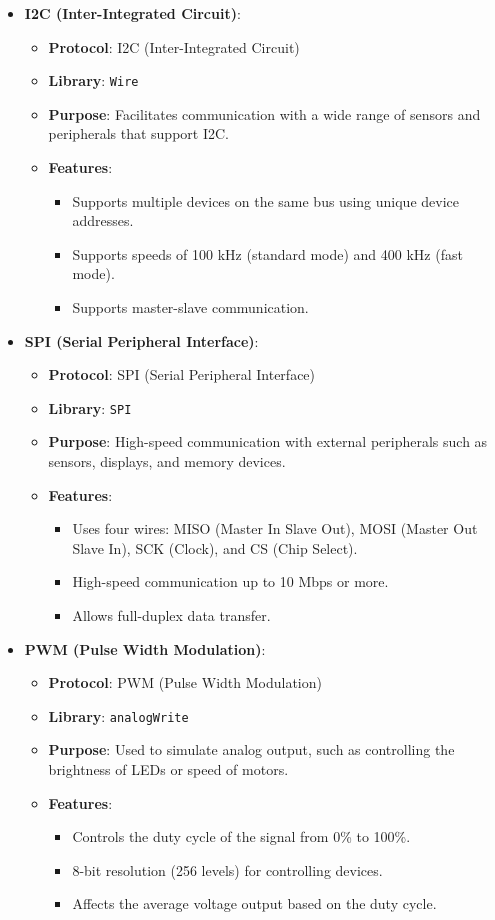 \begin{itemize}
		\item \textbf{I2C (Inter-Integrated Circuit)}:
		\begin{itemize}
			\item \textbf{Protocol}: I2C (Inter-Integrated Circuit)
			\item \textbf{Library}: \texttt{Wire}
			\item \textbf{Purpose}: Facilitates communication with a wide range of sensors and peripherals that support I2C.
			\item \textbf{Features}:
			\begin{itemize}
				\item Supports multiple devices on the same bus using unique device addresses.
				\item Supports speeds of 100 kHz (standard mode) and 400 kHz (fast mode).
				\item Supports master-slave communication.
			\end{itemize}
		\end{itemize}
		
		\item \textbf{SPI (Serial Peripheral Interface)}:
		\begin{itemize}
			\item \textbf{Protocol}: SPI (Serial Peripheral Interface)
			\item \textbf{Library}: \texttt{SPI}
			\item \textbf{Purpose}: High-speed communication with external peripherals such as sensors, displays, and memory devices.
			\item \textbf{Features}:
			\begin{itemize}
				\item Uses four wires: MISO (Master In Slave Out), MOSI (Master Out Slave In), SCK (Clock), and CS (Chip Select).
				\item High-speed communication up to 10 Mbps or more.
				\item Allows full-duplex data transfer.
			\end{itemize}
		\end{itemize}
		
		\item \textbf{PWM (Pulse Width Modulation)}:
		\begin{itemize}
			\item \textbf{Protocol}: PWM (Pulse Width Modulation)
			\item \textbf{Library}: \texttt{analogWrite}
			\item \textbf{Purpose}: Used to simulate analog output, such as controlling the brightness of LEDs or speed of motors.
			\item \textbf{Features}:
			\begin{itemize}
				\item Controls the duty cycle of the signal from 0\% to 100\%.
				\item 8-bit resolution (256 levels) for controlling devices.
				\item Affects the average voltage output based on the duty cycle.
			\end{itemize}
		\end{itemize}
	\end{itemize}
	
